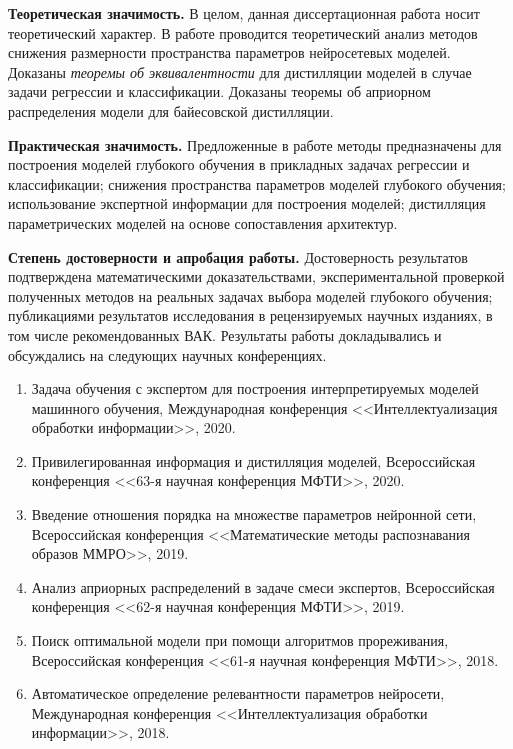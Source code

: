 \vspace{0.5cm}
\textbf{Теоретическая значимость.} В целом, данная диссертационная работа носит теоретический характер. В работе проводится теоретический анализ методов снижения размерности пространства параметров нейросетевых моделей. Доказаны \emph{теоремы об эквивалентности} для дистилляции моделей в случае задачи регрессии и классификации. Доказаны теоремы об априорном распределения модели для байесовской дистилляции.

\vspace{0.5cm}
\textbf{Практическая значимость.} Предложенные в работе методы предназначены для построения моделей глубокого обучения в прикладных задачах регрессии и классификации; снижения пространства параметров моделей глубокого обучения; использование экспертной информации для построения моделей; дистилляция параметрических моделей на основе сопоставления архитектур.

\vspace{0.5cm}
\textbf{Степень достоверности и апробация работы.} Достоверность результатов подтверждена математическими доказательствами, экспериментальной проверкой полученных методов на реальных задачах выбора моделей глубокого обучения; публикациями результатов исследования в рецензируемых научных изданиях, в том числе рекомендованных ВАК. Результаты работы докладывались и обсуждались на следующих научных конференциях.
\begin{enumerate}
    \item Задача обучения с экспертом для построения интерпретируемых моделей машинного обучения, Международная конференция <<Интеллектуализация обработки информации>>, 2020.
    \item Привилегированная информация и дистилляция моделей, Всероссийская конференция <<63-я научная конференция МФТИ>>, 2020.
    \item Введение отношения порядка на множестве параметров нейронной сети, Всероссийская конференция <<Математические методы распознавания образов ММРО>>, 2019.
    \item Анализ априорных распределений в задаче смеси экспертов, Всероссийская конференция <<62-я научная конференция МФТИ>>, 2019.
    \item Поиск оптимальной модели при помощи алгоритмов прореживания, Всероссийская конференция <<61-я научная конференция МФТИ>>, 2018.
    \item Автоматическое определение релевантности параметров нейросети, Международная конференция <<Интеллектуализация обработки информации>>, 2018.
\end{enumerate}

